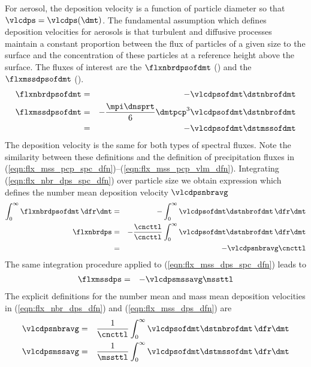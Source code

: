 \documentclass[12pt,twoside]{book}
\begin{document}
For aerosol, the deposition velocity is a function of particle
diameter so that $\vlcdps = \vlcdps(\dmt)$.
The fundamental assumption which defines deposition velocities 
for aerosols is that turbulent and diffusive processes maintain
a constant proportion between the flux of particles of a
given size to the surface and the concentration of these particles at 
a reference height above the surface.
The fluxes of interest are the  $\flxnbrdpsofdmt$ (\nbrxmSsm) and the  $\flxmssdpsofdmt$ (\kgxmSsm).
\begin{eqnarray}
\label{eqn:flx_nbr_dps_spc_dfn}
\flxnbrdpsofdmt & = & - \vlcdpsofdmt \dstnbrofdmt \\
\flxmssdpsofdmt & = & - \frac{\mpi \dnsprt}{6} \dmtpcp^{3} \vlcdpsofdmt \dstnbrofdmt
\nonumber \\
\label{eqn:flx_mss_dps_spc_dfn}
& = & - \vlcdpsofdmt \dstmssofdmt
\end{eqnarray}
The deposition velocity is the same for both types of spectral fluxes.
Note the similarity between these definitions and the definition of
precipitation fluxes in
(\ref{eqn:flx_mss_pcp_spc_dfn})--(\ref{eqn:flx_mss_pcp_vlm_dfn}).
Integrating (\ref{eqn:flx_nbr_dps_spc_dfn}) over particle size 
we obtain expression which defines the number mean deposition
velocity $\vlcdpsnbravg$
\begin{eqnarray}
\int_{0}^{\infty} \flxnbrdpsofdmt \,\dfr\dmt & = & 
- \int_{0}^{\infty} \vlcdpsofdmt \dstnbrofdmt \,\dfr\dmt \nonumber \\
\flxnbrdps & = & 
- \frac{\cncttl}{\cncttl }
\int_{0}^{\infty} \vlcdpsofdmt \dstnbrofdmt \,\dfr\dmt \nonumber \\
& = & - \vlcdpsnbravg \cncttl
\label{eqn:flx_nbr_dps_dfn}
\end{eqnarray}
The same integration procedure applied to
(\ref{eqn:flx_mss_dps_spc_dfn}) leads to 
\begin{eqnarray}
\flxmssdps & = & - \vlcdpsmssavg \mssttl
\label{eqn:flx_mss_dps_dfn}
\end{eqnarray}
The explicit definitions for the number mean and mass mean deposition
velocities in (\ref{eqn:flx_nbr_dps_dfn}) and
(\ref{eqn:flx_mss_dps_dfn}) are
\begin{eqnarray}
\label{eqn:vlc_dps_nbr_dfn}
\vlcdpsnbravg & = & \frac{1}{\cncttl}
\int_{0}^{\infty} \vlcdpsofdmt \dstnbrofdmt \,\dfr\dmt \\
\label{eqn:vlc_dps_mss_dfn}
\vlcdpsmssavg & = & \frac{1}{\mssttl}
\int_{0}^{\infty} \vlcdpsofdmt \dstmssofdmt \,\dfr\dmt
\end{eqnarray}
\end{document}
